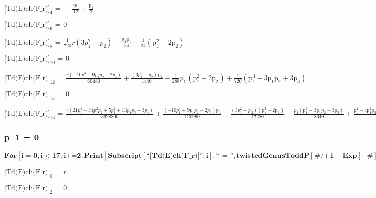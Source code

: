 \documentclass{article}
\newcommand{\unicode}[1]{{}}
\begin{document}
\noindent\(\text{[Td(E)ch(F$\_$r)]}_4\text{ = }-\frac{r p_1}{12}+\frac{\text{p$\unicode{02bc}$}_1}{2}\)

\noindent\(\text{[Td(E)ch(F$\_$r)]}_6\text{ = }0\)

\noindent\(\text{[Td(E)ch(F$\_$r)]}_8\text{ = }\frac{1}{720} r \left(3 p_1^2-p_2\right)-\frac{p_1 \text{p$\unicode{02bc}$}_1}{24}+\frac{1}{24} \left(\text{p$\unicode{02bc}$}_1^2-2
\text{p$\unicode{02bc}$}_2\right)\)

\noindent\(\text{[Td(E)ch(F$\_$r)]}_{10}\text{ = }0\)

\noindent\(\text{[Td(E)ch(F$\_$r)]}_{12}\text{ = }\frac{r \left(-10 p_1^3+9 p_1 p_2-2 p_3\right)}{60480}+\frac{\left(3 p_1^2-p_2\right) \text{p$\unicode{02bc}$}_1}{1440}-\frac{1}{288}
p_1 \left(\text{p$\unicode{02bc}$}_1^2-2 \text{p$\unicode{02bc}$}_2\right)+\frac{1}{720} \left(\text{p$\unicode{02bc}$}_1^3-3 \text{p$\unicode{02bc}$}_1
\text{p$\unicode{02bc}$}_2+3 \text{p$\unicode{02bc}$}_3\right)\)

\noindent\(\text{[Td(E)ch(F$\_$r)]}_{14}\text{ = }0\)

\noindent\(\text{[Td(E)ch(F$\_$r)]}_{16}\text{ = }\frac{r \left(21 p_1^4-34 p_1^2 p_2+5 p_2^2+13 p_1 p_3-3 p_4\right)}{3628800}+\frac{\left(-10 p_1^3+9
p_1 p_2-2 p_3\right) \text{p$\unicode{02bc}$}_1}{120960}+\frac{\left(3 p_1^2-p_2\right) \left(\text{p$\unicode{02bc}$}_1^2-2 \text{p$\unicode{02bc}$}_2\right)}{17280}-\frac{p_1
\left(\text{p$\unicode{02bc}$}_1^3-3 \text{p$\unicode{02bc}$}_1 \text{p$\unicode{02bc}$}_2+3 \text{p$\unicode{02bc}$}_3\right)}{8640}+\frac{\text{p$\unicode{02bc}$}_1^4-4
\text{p$\unicode{02bc}$}_1^2 \text{p$\unicode{02bc}$}_2+2 \text{p$\unicode{02bc}$}_2^2+4 \text{p$\unicode{02bc}$}_1 \text{p$\unicode{02bc}$}_3-4
\text{p$\unicode{02bc}$}_4}{40320}\)

\subsubsection*{p$\_$ 1 = 0}

\begin{doublespace}
\noindent\(\pmb{\text{For}\left[i=0,i<17,i\text{+=}2, \text{Print}\left[\text{Subscript}[\text{{``}[Td(E)ch(F$\_$r)]{''}},i],\text{{``} = {''}},\text{twistedGenusToddP}[\#/(1-\text{Exp}[-\#])\&,i]\text{/.}p_1\to
0\right]\right]}\)
\end{doublespace}

\noindent\(\text{[Td(E)ch(F$\_$r)]}_0\text{ = }r\)

\noindent\(\text{[Td(E)ch(F$\_$r)]}_2\text{ = }0\)
\end{document}
